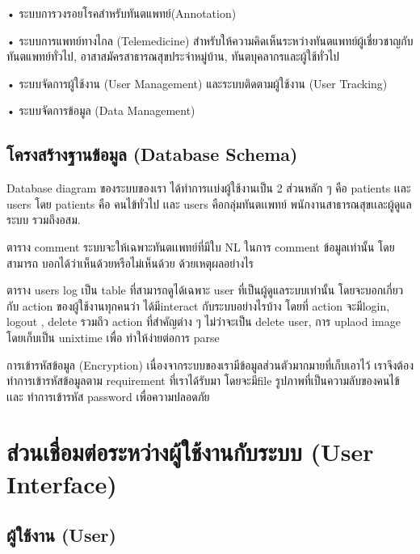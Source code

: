 • ระบบการวงรอยโรคสําหรับทันตแพทย์(Annotation)

• ระบบการแพทย์ทางไกล (Telemedicine) สําหรับให้ความคิดเห็นระหว่างทันตแพทย์ผู้เชี่ยวชาญกับ
ทันตแพทย์ทั่วไป, อาสาสมัครสาธารณสุขประจําหมู่บ้าน, ทันตบุคลากรและผู้ใช้ทั่วไป

• ระบบจัดการผู้ใช้งาน (User Management) และระบบติดตามผู้ใช้งาน (User Tracking)

• ระบบจัดการข้อมูล (Data Management)

\subsection{โครงสร้างฐานข้อมูล (Database Schema)}

Database diagram ของระบบของเรา ได้ทําการเเบ่งผู้ใช้งานเป็น 2 ส่วนหลัก ๆ คือ patients เเละ
users โดย patients คือ คนไข้ทั่วไป เเละ users คือกลุ่มทันตเเพทย์ พนักงานสาธารณสุขเเละผู้ดูแลระบบ
รวมถึงอสม.

ตาราง comment ระบบจะให้เฉพาะทันตเเพทย์ที่มีใบ NL ในการ comment ข้อมูลเท่านั้น โดยสามารถ
บอกได้ว่าเห็นด้วยหรือไม่เห็นด้วย ด้วยเหตุผลอย่างไร

ตาราง users log เป็น table ที่สามารถดูได้เฉพาะ user ที่เป็นผู้ดูแลระบบเท่านั้น โดยจะบอกเกี่ยวกับ
action ของผู้ใช้งานทุกคนว่า ได้มีinteract กับระบบอย่างไรบ้าง โดยที่ action จะมีlogin, logout , delete
รวมถึว action ที่สําคัญต่าง ๆ ไม่ว่าจะเป็น delete user, การ uplaod image โดยเก็บเป็น unixtime เพื่อ
ทําให้ง่ายต่อการ parse

การเข้ารหัสข้อมูล (Encryption) เนื่องจากระบบของเรามีข้อมูลส่วนตัวมากมายที่เก็บเอาไว้ เราจึงต้อง
ทําการเข้ารหัสข้อมูลตาม requirement ที่เราได้รับมา โดยจะมีfile รูปภาพที่เป็นความลับของคนไข้เเละ
ทําการเข้ารหัส password เพื่อความปลอดภัย

\section{ส่วนเชื่อมต่อระหว่างผู้ใช้งานกับระบบ (User Interface)}
\subsection{ผู้ใช้งาน (User)}
